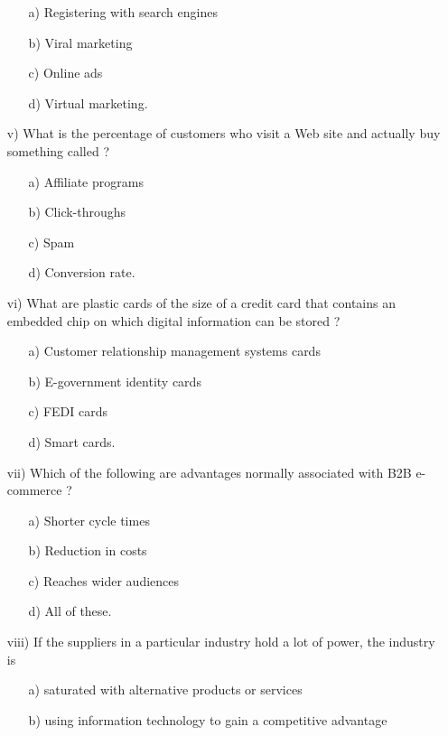 \documentclass{article}
\begin{document}
\begin{enumerate}
    \begin{enumerate}
        \item[a)] Registering with search engines
        \item[b)] Viral marketing
        \item[c)] Online ads
        \item[d)] Virtual marketing.
    \end{enumerate}
    \item[v)] What is the percentage of customers who visit a Web site and actually buy something called ?
    \begin{enumerate}
        \item[a)] Affiliate programs
        \item[b)] Click-throughs
        \item[c)] Spam
        \item[d)] Conversion rate.
    \end{enumerate}
    \item[vi)] What are plastic cards of the size of a credit card that contains an embedded chip on which digital information can be stored ?
    \begin{enumerate}
        \item[a)] Customer relationship management systems cards
        \item[b)] E-government identity cards
        \item[c)] FEDI cards
        \item[d)] Smart cards.
    \end{enumerate}
    \item[vii)] Which of the following are advantages normally associated with B2B e-commerce ?
    \begin{enumerate}
        \item[a)] Shorter cycle times
        \item[b)] Reduction in costs
        \item[c)] Reaches wider audiences
        \item[d)] All of these.
    \end{enumerate}
    \item[viii)] If the suppliers in a particular industry hold a lot of power, the industry is
    \begin{enumerate}
        \item[a)] saturated with alternative products or services
        \item[b)] using information technology to gain a competitive advantage

\end{enumerate}
\end{enumerate}
\end{document}
